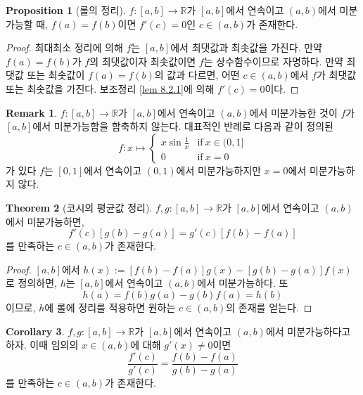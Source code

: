 \documentclass[11pt]{book}
\numberwithin{equation}{chapter}
\def\RR{\mathbb{R}}
\def\textif{\text{if}}
\theoremstyle{definition}
\newtheorem{thm}{Theorem}[section]
\newtheorem{cor}[thm]{Corollary}
\newtheorem{prop}[thm]{Proposition}
\newtheorem*{rem}{Remark}
\begin{document}
\begin{prop}[롤의 정리]
    \(f : [a, b] \to \RR\)가 \([a, b]\)에서 연속이고 \((a, b)\)에서 미분가능할 때, \(f(a) = f(b)\)이면 \(f'(c) = 0\)인 \(c \in (a, b)\)가 존재한다.
\end{prop}
\begin{proof}
    최대최소 정리에 의해 \(f\)는 \([a, b]\)에서 최댓값과 최솟값을 가진다. 만약 \(f(a) = f(b)\)가 \(f\)의 최댓값이자 최솟값이면 \(f\)는 상수함수이므로 자명하다. 만약 최댓값 또는 최솟값이 \(f(a) = f(b)\)의 값과 다르면, 어떤 \(c \in (a, b)\)에서 \(f\)가 최댓값 또는 최솟값을 가진다. 보조정리 \ref{lem 8.2.1}에 의해 \(f'(c) = 0\)이다.
\end{proof}

\begin{rem}
    \(f : [a, b] \to \RR\)가 \([a, b]\)에서 연속이고 \((a, b)\)에서 미분가능한 것이 \(f\)가 \([a, b]\)에서 미분가능함을 함축하지 않는다. 대표적인 반례로 다음과 같이 정의된
    \[
    f : x \mapsto \begin{cases}
        x \sin \frac{1}{x} &\textif \ x \in (0, 1]\\
        0 &\textif \ x = 0
    \end{cases}   
    \]
    가 있다 \(f\)는 \([0, 1]\)에서 연속이고 \((0, 1)\)에서 미분가능하지만 \(x = 0\)에서 미분가능하지 않다.
\end{rem}

\begin{thm}[코시의 평균값 정리]
    \(f, g : [a, b] \to \RR\)가 \([a, b]\)에서 연속이고 \((a, b)\)에서 미분가능하면,
    \[
    f'(c)[g(b) - g(a)] = g'(c)[f(b) - f(a)]    
    \]
    를 만족하는 \(c \in (a, b)\)가 존재한다.
\end{thm}
\begin{proof}
    \([a, b]\)에서 \(h(x) := [f(b) - f(a)]g(x) - [g(b) - g(a)]f(x)\)로 정의하면, \(h\)는 \([a, b]\)에서 연속이고 \((a, b)\)에서 미분가능하다. 또
    \[
    h(a) = f(b)g(a) - g(b)f(a) = h(b)    
    \]
    이므로, \(h\)에 롤에 정리를 적용하면 원하는 \(c \in (a, b)\)의 존재를 얻는다.
\end{proof}

\begin{cor} \label{cor 8.2.4}
    \(f, g : [a, b] \to \RR\)가 \([a, b]\)에서 연속이고 \((a, b)\)에서 미분가능하다고 하자. 이때 임의의 \(x \in (a, b)\)에 대해 \(g'(x) \ne 0\)이면
    \[
      \frac{f'(c)}{g'(c)} = \frac{f(b) - f(a)}{g(b) - g(a)}  
    \]
    를 만족하는 \(c \in (a, b)\)가 존재한다.
\end{cor}
\end{document}

